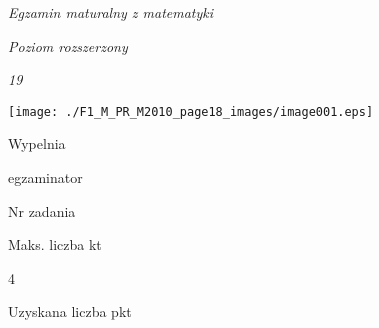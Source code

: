 \documentclass[a4paper,12pt]{article}
\begin{document}
{\it Egzamin maturalny z matematyki}

{\it Poziom rozszerzony}

{\it 19}
\begin{center}
\texttt{[image: ./F1\_M\_PR\_M2010\_page18\_images/image001.eps]}
\end{center}
Wypelnia

egzaminator

Nr zadania

Maks. liczba kt

4

Uzyskana liczba pkt
\end{document}
